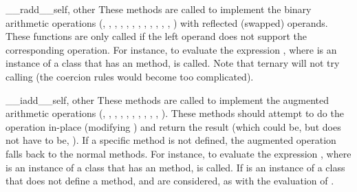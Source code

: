 \begin{methoddesc}{__radd__}{self, other}
These methods are
called to implement the binary arithmetic operations (\code{+},
\code{-}, \code{*}, \code{/}, \code{\%},
,
, \code{**}, \code{<}\code{<},
\code{>}\code{>}, \code{\&}, \code{\^}, \code{|}) with reflected
(swapped) operands.  These functions are only called if the left
operand does not support the corresponding operation.  For instance,
to evaluate the expression \code{-}, where  is an
instance of a class that has an  method,
 is called.  Note that ternary
 will not try calling
 (the coercion rules would become too
complicated).
\end{methoddesc}

\begin{methoddesc}{__iadd__}{self, other}
These methods are called to implement the augmented arithmetic
operations (\code{+=}, \code{-=}, \code{*=}, \code{/=}, \code{\%=},
\code{**=}, \code{<}\code{<=}, \code{>}\code{>=}, \code{\&=},
\code{\^=}, \code{|=}).  These methods should attempt to do the
operation in-place (modifying ) and return the result (which
could be, but does not have to be, ).  If a specific method
is not defined, the augmented operation falls back to the normal
methods.  For instance, to evaluate the expression
\code{+=}, where  is an instance of a class that
has an  method,  is
called.  If  is an instance of a class that does not define a
 method,  and
 are considered, as with the
evaluation of \code{+}.
\end{methoddesc}

